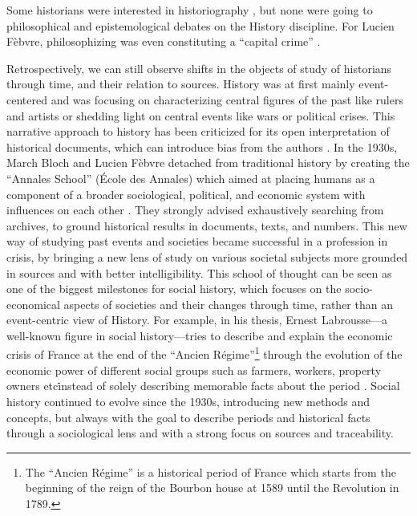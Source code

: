 Some historians were interested in historiography \cite{carbonellHistoriographie1981}, but none were going to philosophical and epistemological debates on the History discipline.
For Lucien Fèbvre, philosophizing was even constituting a ``capital crime'' \cite{febvreVERSAUTREHISTOIRE1949}.

Retrospectively, we can still observe shifts in the objects of study of historians through time, and their relation to sources.
History was at first mainly event-centered and was focusing on characterizing central figures of the past like rulers and artists or shedding light on central events like wars or political crises.
This narrative approach to history has been criticized for its open interpretation of historical documents, which can introduce bias from the authors \cite{bourdieuRapportsEntreSociologie1995}.
In the 1930s, March Bloch and Lucien Fèbvre detached from traditional history by creating the ``Annales School'' (\'Ecole des Annales) which aimed at placing humans as a component of a broader sociological, political, and economic system with influences on each other \cite{burkeHistorySocialTheory2005}.
They strongly advised exhaustively searching from archives, to ground historical results in documents, texts, and numbers.
This new way of studying past events and societies became successful in a profession in crisis, by bringing a new lens of study on various societal subjects more grounded in sources and with better intelligibility.
This school of thought can be seen as one of the biggest milestones for social history, which focuses on the socio-economical aspects of societies and their changes through time, rather than an event-centric view of History.
For example, in his thesis, Ernest Labrousse---a well-known figure in social history---tries to describe and explain the economic crisis of France at the end of the ``Ancien Régime''\footnote{The ``Ancien Régime'' is a historical period of France which starts from the beginning of the reign of the Bourbon house at 1589 until the Revolution in 1789.} through the evolution of the economic power of different social groups such as farmers, workers, property owners etc\. instead of solely describing memorable facts about the period \cite{labrousse1990crise}.
Social history continued to evolve since the 1930s, introducing new methods and concepts, but always with the goal to describe periods and historical facts through a sociological lens and with a strong focus on sources and traceability.


